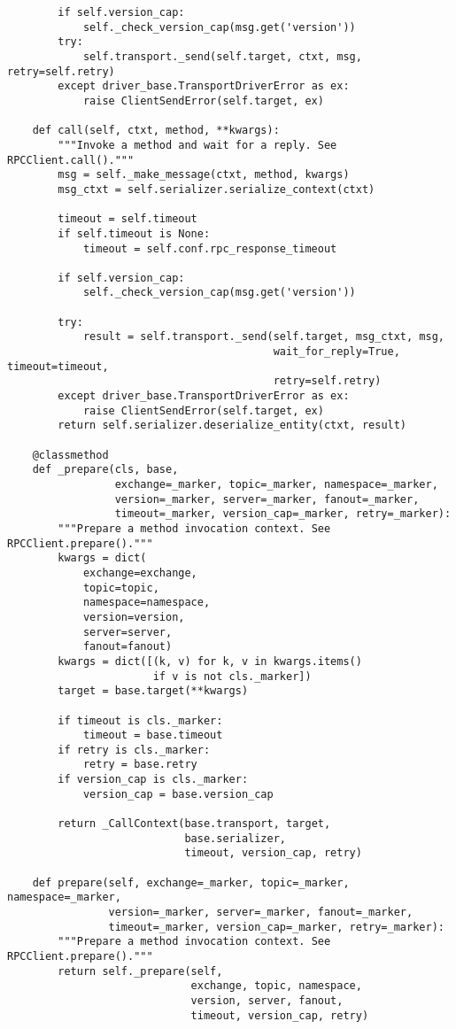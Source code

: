 \documentclass[a4paper,left=2.5cm,right=2.5cm,11pt]{article}
\begin{document}
\begin{lstlisting}
        if self.version_cap:
            self._check_version_cap(msg.get('version'))
        try:
            self.transport._send(self.target, ctxt, msg, retry=self.retry)
        except driver_base.TransportDriverError as ex:
            raise ClientSendError(self.target, ex)

    def call(self, ctxt, method, **kwargs):
        """Invoke a method and wait for a reply. See RPCClient.call()."""
        msg = self._make_message(ctxt, method, kwargs)
        msg_ctxt = self.serializer.serialize_context(ctxt)

        timeout = self.timeout
        if self.timeout is None:
            timeout = self.conf.rpc_response_timeout

        if self.version_cap:
            self._check_version_cap(msg.get('version'))

        try:
            result = self.transport._send(self.target, msg_ctxt, msg,
                                          wait_for_reply=True, timeout=timeout,
                                          retry=self.retry)
        except driver_base.TransportDriverError as ex:
            raise ClientSendError(self.target, ex)
        return self.serializer.deserialize_entity(ctxt, result)

    @classmethod
    def _prepare(cls, base,
                 exchange=_marker, topic=_marker, namespace=_marker,
                 version=_marker, server=_marker, fanout=_marker,
                 timeout=_marker, version_cap=_marker, retry=_marker):
        """Prepare a method invocation context. See RPCClient.prepare()."""
        kwargs = dict(
            exchange=exchange,
            topic=topic,
            namespace=namespace,
            version=version,
            server=server,
            fanout=fanout)
        kwargs = dict([(k, v) for k, v in kwargs.items()
                       if v is not cls._marker])
        target = base.target(**kwargs)

        if timeout is cls._marker:
            timeout = base.timeout
        if retry is cls._marker:
            retry = base.retry
        if version_cap is cls._marker:
            version_cap = base.version_cap

        return _CallContext(base.transport, target,
                            base.serializer,
                            timeout, version_cap, retry)

    def prepare(self, exchange=_marker, topic=_marker, namespace=_marker,
                version=_marker, server=_marker, fanout=_marker,
                timeout=_marker, version_cap=_marker, retry=_marker):
        """Prepare a method invocation context. See RPCClient.prepare()."""
        return self._prepare(self,
                             exchange, topic, namespace,
                             version, server, fanout,
                             timeout, version_cap, retry)

    \end{lstlisting}
\end{document}
